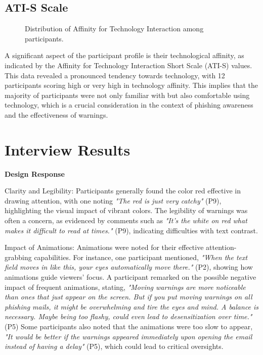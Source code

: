 \documentclass[
  a4paper,  %
  twoside,  %
  bibliography=totoc,
  headsepline,
  cleardoublepage=empty,
  parskip=half,
  draft=false
]{scrbook}
\begin{document}
\subsection{ATI-S Scale}

\begin{figure}[H]
\centering
{}
\caption{Distribution of Affinity for Technology Interaction among participants.}
\label{ati}
\end{figure}

A significant aspect of the participant profile is their technological affinity, as indicated by the Affinity for Technology Interaction Short Scale (ATI-S) values. This data revealed a pronounced tendency towards technology, with 12 participants scoring high or very high in technology affinity. This implies that the majority of participants were not only familiar with but also comfortable using technology, which is a crucial consideration in the context of phishing awareness and the effectiveness of warnings.

\section{Interview Results}

\textbf{Design Response}

Clarity and Legibility: Participants generally found the color red effective in drawing attention, with one noting \textit{"The red is just very catchy"} (P9), highlighting the visual impact of vibrant colors. The legibility of warnings was often a concern, as evidenced by comments such as \textit{"It’s the white on red what makes it difficult to read at times."} (P9), indicating difficulties with text contrast. 

Impact of Animations: Animations were noted for their effective attention-grabbing capabilities. For instance, one participant mentioned, \textit{"When the text field moves in like this, your eyes automatically move there."} (P2), showing how animations guide viewers' focus. A participant remarked on the possible negative impact of frequent animations, stating, \textit{"Moving warnings are more noticeable than ones that just appear on the screen. But if you put moving warnings on all phishing mails, it might be overwhelming and tire the eyes and mind. A balance is necessary. Maybe being too flashy, could even lead to desensitization over time."} (P5) Some participants also noted that the animations were too slow to appear, \textit{"It would be better if the warnings appeared immediately upon opening the email instead of having a delay"} (P5), which could lead to critical oversights. 
    
\end{document}
